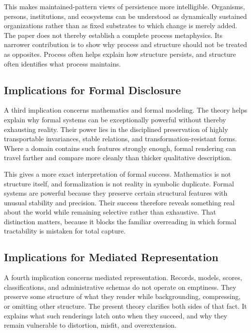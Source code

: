 \documentclass[11pt]{article}
\begin{document}
This makes maintained-pattern views of persistence more intelligible. Organisms, persons, institutions, and ecosystems can be understood as dynamically sustained organizations rather than as fixed substrates to which change is merely added. The paper does not thereby establish a complete process metaphysics. Its narrower contribution is to show why process and structure should not be treated as opposites. Process often helps explain how structure persists, and structure often identifies what process maintains.

\subsection{Implications for Formal Disclosure}

A third implication concerns mathematics and formal modeling. The theory helps explain why formal systems can be exceptionally powerful without thereby exhausting reality. Their power lies in the disciplined preservation of highly transportable invariances, stable relations, and transformation-resistant forms. Where a domain contains such features strongly enough, formal rendering can travel farther and compare more cleanly than thicker qualitative description.

This gives a more exact interpretation of formal success. Mathematics is not structure itself, and formalization is not reality in symbolic duplicate. Formal systems are powerful because they preserve certain structural features with unusual stability and precision. Their success therefore reveals something real about the world while remaining selective rather than exhaustive. That distinction matters, because it blocks the familiar overreading in which formal tractability is mistaken for total capture.

\subsection{Implications for Mediated Representation}

A fourth implication concerns mediated representation. Records, models, scores, classifications, and administrative schemas do not operate on emptiness. They preserve some structure of what they render while backgrounding, compressing, or omitting other structure. The present theory clarifies both sides of that fact. It explains what such renderings latch onto when they succeed, and why they remain vulnerable to distortion, misfit, and overextension.
\end{document}

